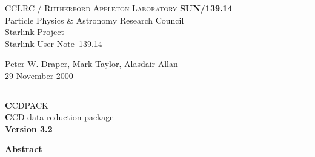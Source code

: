 \documentclass[twoside,11pt]{article}
\newcommand{\stardoccategory}  {Starlink User Note}
\newcommand{\stardocinitials}  {SUN}
\newcommand{\stardocnumber}    {139.14}
\newcommand{\stardocauthors}   {Peter W. Draper, Mark Taylor, Alasdair Allan}
\newcommand{\stardocdate}      {29 November 2000}
\newcommand{\stardoctitle}     {CCDPACK}
\newcommand{\stardoconeline}   {CCD data reduction package}
\newcommand{\stardocversion}   {Version 3.2}
\newcommand{\stardocname}{\stardocinitials /\stardocnumber}
\newenvironment{latexonly}{}{}
\renewcommand{\_}{\texttt{\symbol{95}}}
\begin{document}
\thispagestyle{empty}

\begin{latexonly}
   CCLRC / \textsc{Rutherford Appleton Laboratory} \hfill \textbf{\stardocname}\\
   {\large Particle Physics \& Astronomy Research Council}\\
   {\large Starlink Project\\}
   {\large \stardoccategory\ \stardocnumber}
   \begin{flushright}
   \stardocauthors\\
   \stardocdate
   \end{flushright}
   \vspace{-4mm}
   \rule{\textwidth}{0.5mm}
   \vspace{5mm}
   \begin{center}
   {\Huge\textbf  \stardoctitle \\ [2.5ex]}
   {\LARGE\textbf \stardoconeline \\ [4ex]}
   {\large \bf \stardocversion}
   \end{center}
   \vspace{5mm}


   \vspace{10mm}
   \begin{center}
      {\Large\textbf{Abstract}}
   \end{center}
\end{latexonly}
\end{document}

